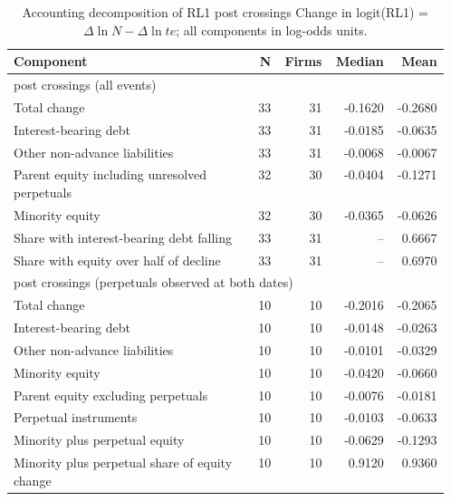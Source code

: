 \begin{table}[!htbp]\centering\scriptsize
\caption{Accounting decomposition of RL1 post crossings Change in logit(RL1) = $\Delta\ln N - \Delta\ln te$; all components in log-odds units.}
\begin{threeparttable}
\begin{tabular}{p{0.56\linewidth}rrrr}
\toprule
Component & N & Firms & Median & Mean \\
\midrule
\multicolumn{5}{l}{post crossings (all events)} \\
Total change & 33 & 31 & -0.1620 & -0.2680 \\
Interest-bearing debt & 33 & 31 & -0.0185 & -0.0635 \\
Other non-advance liabilities & 33 & 31 & -0.0068 & -0.0067 \\
Parent equity including unresolved perpetuals & 32 & 30 & -0.0404 & -0.1271 \\
Minority equity & 32 & 30 & -0.0365 & -0.0626 \\
Share with interest-bearing debt falling & 33 & 31 & -- & 0.6667 \\
Share with equity over half of decline & 33 & 31 & -- & 0.6970 \\
\multicolumn{5}{l}{post crossings (perpetuals observed at both dates)} \\
Total change & 10 & 10 & -0.2016 & -0.2065 \\
Interest-bearing debt & 10 & 10 & -0.0148 & -0.0263 \\
Other non-advance liabilities & 10 & 10 & -0.0101 & -0.0329 \\
Minority equity & 10 & 10 & -0.0420 & -0.0660 \\
Parent equity excluding perpetuals & 10 & 10 & -0.0076 & -0.0181 \\
Perpetual instruments & 10 & 10 & -0.0103 & -0.0633 \\
Minority plus perpetual equity & 10 & 10 & -0.0629 & -0.1293 \\
Minority plus perpetual share of equity change & 10 & 10 & 0.9120 & 0.9360 \\
\bottomrule
\end{tabular}
\begin{tablenotes}[flushleft]\footnotesize

\end{tablenotes}
\end{threeparttable}
\end{table}
